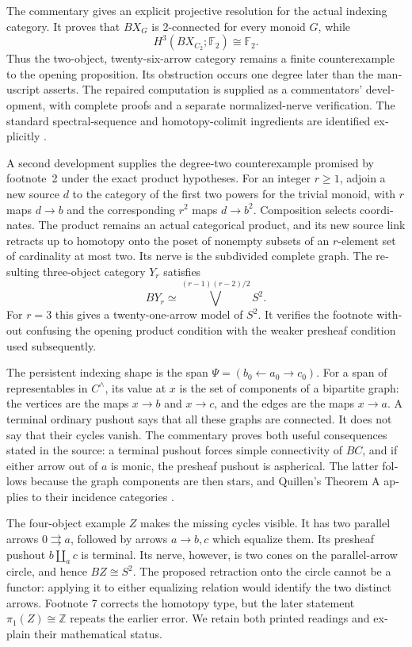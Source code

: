 \begin{otherlanguage}{english}
The commentary gives an explicit projective resolution for the actual indexing category. It proves that \(BX_G\) is \(2\)-connected for every monoid \(G\), while
\[
 H^3(BX_{C_2};\mathbb F_2)\cong\mathbb F_2.
\]
Thus the two-object, twenty-six-arrow category remains a finite counterexample to the opening proposition. Its obstruction occurs one degree later than the manuscript asserts. The repaired computation is supplied as a commentators' development, with complete proofs and a separate normalized-nerve verification. The standard spectral-sequence and homotopy-colimit ingredients are identified explicitly \citep{Cegarra2020,Thomason1979}.

A second development supplies the degree-two counterexample promised by footnote~2 under the exact product hypotheses. For an integer \(r\geq1\), adjoin a new source \(d\) to the category of the first two powers for the trivial monoid, with \(r\) maps \(d\to b\) and the corresponding \(r^2\) maps \(d\to b^2\). Composition selects coordinates. The product remains an actual categorical product, and its new source link retracts up to homotopy onto the poset of nonempty subsets of an \(r\)-element set of cardinality at most two. Its nerve is the subdivided complete graph. The resulting three-object category \(Y_r\) satisfies
\[
 BY_r\simeq\bigvee^{(r-1)(r-2)/2}S^2.
\]
For \(r=3\) this gives a twenty-one-arrow model of \(S^2\). It verifies the footnote without confusing the opening product condition with the weaker presheaf condition used subsequently.

The persistent indexing shape is the span \(\Psi=(b_0\leftarrow a_0\to c_0)\). For a span of representables in \(C^\wedge\), its value at \(x\) is the set of components of a bipartite graph: the vertices are the maps \(x\to b\) and \(x\to c\), and the edges are the maps \(x\to a\). A terminal ordinary pushout says that all these graphs are connected. It does not say that their cycles vanish. The commentary proves both useful consequences stated in the source: a terminal pushout forces simple connectivity of \(BC\), and if either arrow out of \(a\) is monic, the presheaf pushout is aspherical. The latter follows because the graph components are then stars, and Quillen's Theorem A applies to their incidence categories \citep{Quillen1973}.

The four-object example \(Z\) makes the missing cycles visible. It has two parallel arrows \(0\rightrightarrows a\), followed by arrows \(a\to b,c\) which equalize them. Its presheaf pushout \(b\amalg_a c\) is terminal. Its nerve, however, is two cones on the parallel-arrow circle, and hence \(BZ\cong S^2\). The proposed retraction onto the circle cannot be a functor: applying it to either equalizing relation would identify the two distinct arrows. Footnote 7 corrects the homotopy type, but the later statement \(\pi_1(Z)\cong\mathbb Z\) repeats the earlier error. We retain both printed readings and explain their mathematical status.


\end{otherlanguage}

